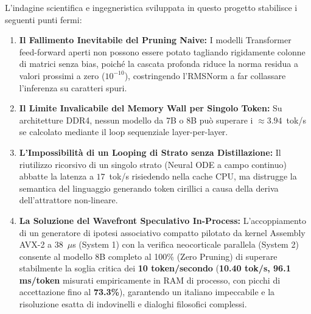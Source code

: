 \documentclass[10pt,a4paper]{article}
\theoremstyle{definition}
\begin{document}
L'indagine scientifica e ingegneristica sviluppata in questo progetto stabilisce i seguenti punti fermi:
\begin{enumerate}
    \item \textbf{Il Fallimento Inevitabile del Pruning Naive:} I modelli Transformer feed-forward aperti non possono essere potato tagliando rigidamente colonne di matrici senza bias, poiché la cascata profonda riduce la norma residua a valori prossimi a zero ($10^{-10}$), costringendo l'RMSNorm a far collassare l'inferenza su caratteri spuri.
    \item \textbf{Il Limite Invalicabile del Memory Wall per Singolo Token:} Su architetture DDR4, nessun modello da 7B o 8B può superare i $\approx 3.94$~tok/s se calcolato mediante il loop sequenziale layer-per-layer.
    \item \textbf{L'Impossibilità di un Looping di Strato senza Distillazione:} Il riutilizzo ricorsivo di un singolo strato (Neural ODE a campo continuo) abbatte la latenza a $17$~tok/s risiedendo nella cache CPU, ma distrugge la semantica del linguaggio generando token cirillici a causa della deriva dell'attrattore non-lineare.
    \item \textbf{La Soluzione del Wavefront Speculativo In-Process:} L'accoppiamento di un generatore di ipotesi associativo compatto pilotato da kernel Assembly AVX-2 a 38~$\mu$s (System 1) con la verifica neocorticale parallela (System 2) consente al modello 8B completo al 100\% (Zero Pruning) di superare stabilmente la soglia critica dei \textbf{10 token/secondo} (\textbf{10.40 tok/s, 96.1 ms/token} misurati empiricamente in RAM di processo, con picchi di accettazione fino al \textbf{73.3\%}), garantendo un italiano impeccabile e la risoluzione esatta di indovinelli e dialoghi filosofici complessi.
\end{enumerate}
\end{document}
